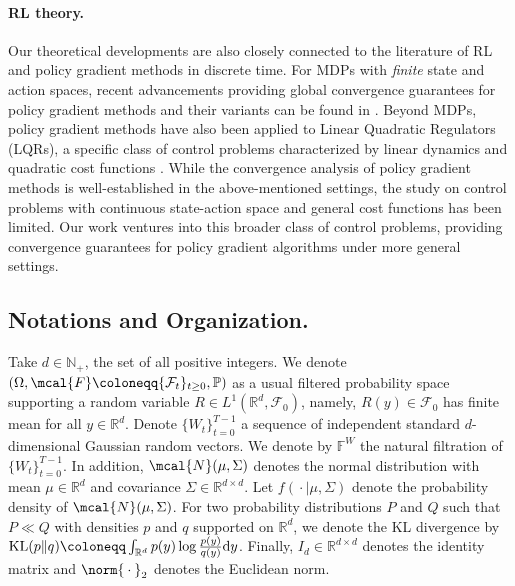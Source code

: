 \documentclass{article}
\newcommand{\R}{\mathbb{R}}
\begin{document}
\paragraph{RL theory.}
Our theoretical developments are also closely connected to the literature of RL and policy gradient methods in discrete time. For MDPs with {\it finite} state and action spaces, recent advancements providing global convergence guarantees for policy gradient methods and their variants can be found in \cite{bhandari2021linear, bhandari2024global,berner2022optimal,Cen2021FastGC,Ding2020NaturalPG,Fu2021SingleTimescaleAP,Liu2019NeuralPR,Liu2020AnIA,Wang2020NeuralPG,xiao2022convergence,Xu2021DoublyRO,zhang2020variational,zhang2021provably,fatkhullin2023stochastic,zhan2023policy,mondal2024improved}. Beyond MDPs, policy gradient methods have also been applied to Linear Quadratic Regulators (LQRs), a specific class of control problems characterized by linear dynamics and quadratic cost functions \cite{bu2019lqr,fazel2018global,hambly2021policy,malik2019derivative,mohammadi2019global,szpruch2021exploration,szpruch2022optimal,wang2020reinforcement,han2023policy,guo2023fast,zhou2023single}. While the convergence analysis of policy gradient methods is well-established in the above-mentioned settings, the study on control problems with continuous state-action space and general cost functions has been limited. Our work ventures into this broader class of control problems, providing convergence guarantees for policy gradient algorithms under  more general settings. 

%




\subsection*{Notations and Organization.} Take $d\in \mathbb{N}_{+}$, the set of all positive integers. We denote $(\Omega, \mcal{F}\coloneqq\{\mathcal{F}_t\}_{t \ge 0}, \mathbb{P})$ as a usual filtered probability space supporting a random variable $R\in L^1(\mathbb{R}^d,\mathcal{F}_0)$, namely, $R(y)\in \mathcal{F}_0$ has finite mean for all $y\in \mathbb{R}^d$. Denote $\{W_t\}_{t =0}^{T-1}$ a sequence of independent standard $d$-dimensional Gaussian random vectors. We denote by $\mathbb{F}^W$ the natural filtration of $\{W_t\}_{t =0}^{T-1}$. In addition, $\mcal{N}(\mu, \Sigma)$ denotes the normal distribution with mean $\mu \in \R^d$ and covariance $\Sigma \in \R^{d\times d}$. Let $f({}\cdot{}\vert\mu, \Sigma)$ denote the probability density of $\mcal{N}(\mu, \Sigma)$. For two probability distributions $P$ and $Q$ such that $P \ll Q$ with densities $p$ and $q$ supported on $\R^d$, we denote the KL divergence by ${\rm KL}(p \| q) \coloneqq \int_{\R^d}p(y)\log\frac{p(y)}{q(y)}{\rm d}y$. Finally, $I_d \in \R^{d\times d} $ denotes the identity matrix and  $\norm{{}\cdot{}}_2$ denotes the Euclidean norm. 
\end{document}
